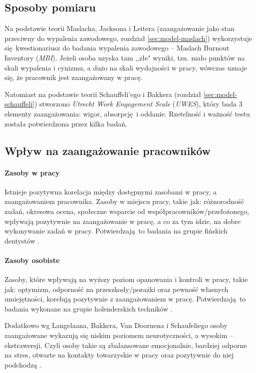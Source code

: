 \subsection{Sposoby pomiaru}
Na podstawie teorii Maslacha, Jacksona i Leitera (zaangażowanie jako stan przeciwny do wypalenia zawodowego, rozdział \ref{sec:model-maslach}) wykorzystuje się kwestionariusz do badania wypalenia zawodowego -- Maslach Burnout Inventory (\emph{MBI}). Jeżeli osoba uzyska tam ,,złe" wyniki, tzn. mało punktów na skali wypalenia i cynizmu, a dużo na skali wydajności w pracy, wówczas uznaje się, że pracownik jest zaangażowany w pracę.

Natomiast na podstawie teorii Schauffeli'ego i Bakkera (rozdział \ref{sec:model-schauffeli}) stworzono \emph{Utrecht Work Engagement Scale} (\emph{UWES}), który bada 3 elementy zaangażowania: wigor, absorpcję i oddanie. Rzetelność i ważność testu została potwierdzona przez kilka badań.

\subsection{Wpływ na zaangażowanie pracowników}
\label{sec:theory-eng-infl}
\paragraph{Zasoby w pracy}
Istnieje pozytywna korelacja między dostępnymi zasobami w pracy, a zaangażowaniem pracownika. Zasoby w miejscu pracy, takie jak: różnorodność zadań, okresowa ocena, społeczne wsparcie od współpracowników/przełożonego, wpływają pozytywnie na zaangażowanie w pracę, a co za tym idzie, na dobre wykonywanie zadań w pracy. Potwierdzają to badania na grupie fińskich dentystów \citep{hakanen2008positive}.
\paragraph{Zasoby osobiste}
Zasoby, które wpływają na wyższy poziom opanowania i kontroli w pracy, takie jak: optymizm, odporność na przeszkody/porażki oraz pewność własnych umiejętności, korelują pozytywnie z zaangażowaniem w pracę. Potwierdzają to badania wykonane na grupie holenderskich techników \citep{xanthopoulou2007role}.

Dodatkowo wg Langelaana, Bakkera, Van Doornena i Schaufeliego osoby zaangażowane wykazują się niskim poziomem neurotyczności, a wysokim -- ekstrawersji. Czyli osoby takie są zbalansowane emocjonalnie, bardziej odporne na stres, otwarte na kontakty towarzyskie w pracy oraz pozytywnie do niej podchodzą \citep{langelaan2006burnout}. 

